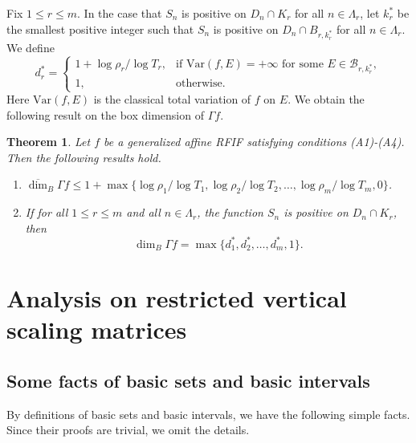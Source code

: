 \documentclass[11pt]{amsart}
\newtheorem{thm}{Theorem}[section]
\theoremstyle{definition}
\theoremstyle{remark}
\numberwithin{equation}{section}
\newcommand{\mB}{{\mathcal B}}
\newcommand{\uprho}{{{\rho}}}
\newcommand{\Var}{\mathrm{Var}}
\def\updimB{\overline{\dim}_B}
\begin{document}
Fix $1\leq r\leq m$. In the case that $S_n$ is positive on $D_n\cap K_r$ for all $n\in \Lambda_r$, let $k_r^*$ be the smallest positive integer such that $S_n$ is positive on $D_n\cap B_{r,k_r^*}$ for all $n\in \Lambda_r$. We define
\begin{equation}\label{eq:def-drstar}
	d_r^*=\begin{cases}
		1+\log\rho_r/\log T_r, & \textrm{if } \Var(f,E)=+\infty \textrm{ for some } E\in \mB_{r,k_r^*}, \\
		1, & \textrm{otherwise}.
	\end{cases}
\end{equation}
Here $\Var(f,E)$ is the classical total variation of $f$ on $E$. 
We obtain the following result on the box dimension of $\Gamma f$. 
\begin{thm}\label{thm:Main-Results-x1}
	Let $f$ be a generalized affine RFIF satisfying conditions (A1)-(A4). Then the following results hold.
	\begin{enumerate}
		\item $\updimB \Gamma f \leq 1 + \max\big\{ \log\uprho_1/ \log T_1,\log\uprho_2/\log T_2,\ldots, \log \uprho_m/ \log T_m,0 \big\}$.
		\item If for all $1\leq r\leq m$ and all $n\in \Lambda_r$, the function $S_n $ is positive on $D_n \cap K_r$, then 
		\[
		 \dim_B \Gamma f = \max\{d_1^*, d_2^*,\ldots, d_m^*,1\}.
		\]		
	\end{enumerate}
\end{thm}















\section{Analysis on restricted vertical scaling matrices}
\subsection{Some facts of basic sets and basic intervals}

By definitions of basic sets and basic intervals, we have the following simple facts. Since their proofs are trivial, we omit the details.
\end{document}
